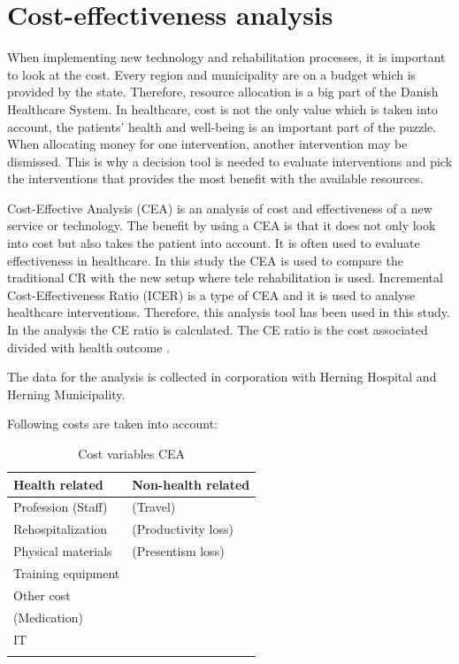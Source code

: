 \section{Cost-effectiveness analysis}

When implementing new technology and rehabilitation processes, it is important to look at the cost. Every region and municipality are on a budget which is provided by the state. Therefore, resource allocation is a big part of the Danish Healthcare System. In healthcare, cost is not the only value which is taken into account, the patients’ health and well-being is an important part of the puzzle. When allocating money for one intervention, another intervention may be dismissed. This is why a decision tool is needed to evaluate interventions and pick the interventions that provides the most benefit with the available resources.

Cost-Effective Analysis (CEA) is an analysis of cost and effectiveness of a new service or technology. The benefit by using a CEA is that it does not only look into cost but also takes the patient into account. It is often used to evaluate effectiveness in healthcare. In this study the CEA is used to compare the traditional CR with the new setup where tele rehabilitation is used. Incremental Cost-Effectiveness Ratio (ICER) is a type of CEA and it is used to analyse healthcare interventions. Therefore, this analysis tool has been used in this study. In the analysis the CE ratio is calculated. The CE ratio is the cost associated divided with health outcome \cite{bang2012median}.

The data for the analysis is collected in corporation with Herning Hospital and Herning Municipality. 

Following costs are taken into account:


\begin{longtabu} to 
	\textbf{Health related} & \textbf{Non-health related}\\[-1ex]
	\midrule
	Profession (Staff) & (Travel) \\[-1ex]
	Rehospitalization & (Productivity loss) \\[-1ex]
	Physical materials & (Presentism loss)\\[-1ex]
	Training equipment &  \\[-1ex]
	Other cost &  \\[-1ex]
	(Medication) &  \\[-1ex]
	IT &  \\[-1ex]
	\hline
	\caption{Cost variables CEA}
\end{longtabu}


